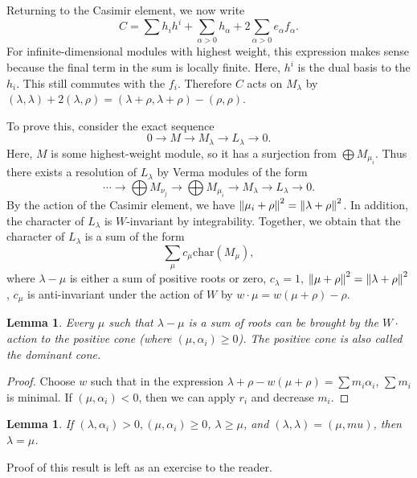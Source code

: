 \documentclass[leqno, openany]{memoir}
\newtheorem{lem}[thm]{Lemma}
\theoremstyle{definition}
\theoremstyle{remark}
\theoremstyle{plain}
\theoremstyle{definition}
\theoremstyle{remark}
\newcommand{\mr}[1]{\mathrm{#1}}
\begin{document}
Returning to the Casimir element, we now write
\[ C = \sum h_i h^i + \sum_{\alpha > 0} h_{\alpha} + 2 \sum_{\alpha > 0} e_{\alpha} f_{\alpha}. \]
For infinite-dimensional modules with highest weight, this expression makes sense because the final term in the sum is locally finite. Here, $h^i$ is the dual basis to the $h_i$. This still commutes with the $f_i$. Therefore $C$ acts on $M_{\lambda}$ by $(\lambda, \lambda) + 2 (\lambda, \rho) = (\lambda + \rho, \lambda + \rho) - (\rho, \rho)$.

To prove this, consider the exact sequence
\[ 0 \to M \to M_{\lambda} \to L_{\lambda} \to 0. \]
Here, $M$ is some highest-weight module, so it has a surjection from $\bigoplus M_{\mu_i}$. Thus there exists a resolution of $L_{\lambda}$ by Verma modules of the form
\[ \cdots \to \bigoplus M_{\nu_j} \to \bigoplus M_{\mu_i} \to M_{\lambda} \to L_{\lambda} \to 0. \]
By the action of the Casimir element, we have $\norm{\mu_i + \rho}^2 = \norm{\lambda + \rho}^2$. In addition, the character of $L_{\lambda}$ is $W$-invariant by integrability. Together, we obtain that the character of $L_{\lambda}$ is a sum of the form
\[ \sum_{\mu} c_{\mu} \mr{char}(M_{\mu}), \]
where $\lambda - \mu$ is either a sum of positive roots or zero, $c_{\lambda} = 1$, $\norm{\mu + \rho}^2 = \norm{\lambda + \rho}^2$, $c_{\mu}$ is anti-invariant under the action of $W$ by $w \cdot \mu = w(\mu +\rho)-\rho$.

\begin{lem}
    Every $\mu$ such that $\lambda - \mu$ is a sum of roots can be brought by the $W \cdot$ action to the positive cone (where $(\mu,\alpha_i) \geq 0$). The positive cone is also called the dominant cone.
\end{lem}

\begin{proof}
    Choose $w$ such that in the expression $\lambda + \rho - w(\mu + \rho) = \sum m_i \alpha_i$, $\sum m_i$ is minimal. If $(\mu, \alpha_i) < 0$, then we can apply $r_i$ and decrease $m_i$.
\end{proof}

\begin{lem}
    If $(\lambda, \alpha_i) > 0, (\mu, \alpha_i) \geq 0$, $\lambda \geq \mu$, and $(\lambda, \lambda) = (\mu, mu)$, then $\lambda = \mu$.
\end{lem}

Proof of this result is left as an exercise to the reader.
\end{document}
